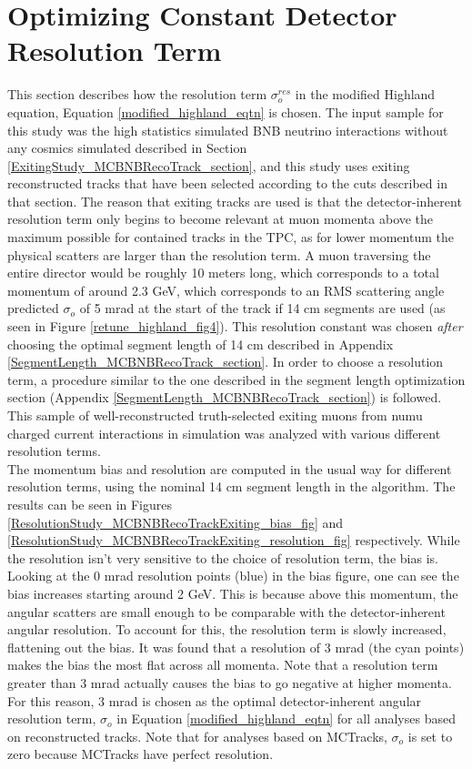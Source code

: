 \section{Optimizing Constant Detector Resolution Term}\label{ResolutionStudy_MCBNBRecoTrack_section}
This section describes how the resolution term $\sigma_o^{res}$ in the modified Highland equation, Equation \ref{modified_highland_eqtn} is chosen. The input sample for this study was the high statistics simulated BNB neutrino interactions without any cosmics simulated described in Section \ref{ExitingStudy_MCBNBRecoTrack_section}, and this study uses exiting reconstructed tracks that have been selected according to the cuts described in that section. The reason that exiting tracks are used is that the detector-inherent resolution term only begins to become relevant at muon momenta above the maximum possible for contained tracks in the TPC, as for lower momentum the physical scatters are larger than the resolution term. A muon traversing the entire director would be roughly 10 meters long, which corresponds to a total momentum of around 2.3 GeV, which corresponds to an RMS scattering angle predicted $\sigma_o$ of 5 mrad at the start of the track if 14 cm segments are used (as seen in Figure \ref{retune_highland_fig4}). This resolution constant was chosen \textit{after} choosing the optimal segment length of 14 cm described in Appendix \ref{SegmentLength_MCBNBRecoTrack_section}. In order to choose a resolution term, a procedure similar to the one described in the segment length optimization section (Appendix \ref{SegmentLength_MCBNBRecoTrack_section}) is followed. This sample of well-reconstructed truth-selected exiting muons from numu charged current interactions in simulation was analyzed with various different resolution terms.\\

The momentum bias and resolution are computed in the usual way for different resolution terms, using the nominal 14 cm segment length in the algorithm. The results can be seen in Figures \ref{ResolutionStudy_MCBNBRecoTrackExiting_bias_fig} and \ref{ResolutionStudy_MCBNBRecoTrackExiting_resolution_fig} respectively. While the resolution isn't very sensitive to the choice of resolution term, the bias is. Looking at the 0 mrad resolution points (blue) in the bias figure, one can see the bias increases starting around 2 GeV. This is because above this momentum, the angular scatters are small enough to be comparable with the detector-inherent angular resolution. To account for this, the resolution term is slowly increased, flattening out the bias. It was found that a resolution of 3 mrad (the cyan points) makes the bias the most flat across all momenta. Note that a resolution term greater than 3 mrad actually causes the bias to go negative at higher momenta. For this reason, 3 mrad is chosen as the optimal detector-inherent angular resolution term, $\sigma_o$ in Equation \ref{modified_highland_eqtn} for all analyses based on reconstructed tracks. Note that for analyses based on {\sc MCTracks}, $\sigma_o$ is set to zero because {\sc MCTracks} have perfect resolution.

